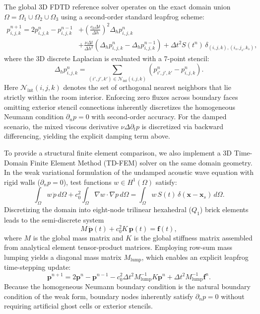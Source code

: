 \documentclass{Configuration_Files/PoliMi3i_thesis}
\newif\ifshowthesischanges
\DeclareRobustCommand{\thesischange}[2]{%
    \ifshowthesischanges
        \textcolor{#1}{#2}%
    \else
        #2%
    \fi
}
\def\thesischange#1#2{#2}%
\begin{document}
\thesischange{red}{The global 3D FDTD reference solver operates on the exact domain union $\Omega = \Omega_1 \cup \Omega_2 \cup \Omega_3$ using a second-order standard leapfrog scheme:
\begin{equation}
\begin{aligned}
p^{n+1}_{i,j,k} = 2 p^n_{i,j,k} - p^{n-1}_{i,j,k} &+ \left(\frac{c_0 \Delta t}{\Delta h}\right)^2 \Delta_h p^n_{i,j,k} \\
&+ \frac{\nu \Delta t}{\Delta h^2} \left( \Delta_h p^n_{i,j,k} - \Delta_h p^{n-1}_{i,j,k} \right) + \Delta t^2 S(t^n) \, \delta_{(i,j,k),(i_s,j_s,k_s)},
\end{aligned}
\end{equation}
where the 3D discrete Laplacian is evaluated with a 7-point stencil:
\begin{equation}
\Delta_h p^n_{i,j,k} = \sum_{(i',j',k') \in \mathcal{N}_{\text{int}}(i,j,k)} \left( p^n_{i',j',k'} - p^n_{i,j,k} \right).
\end{equation}
Here $\mathcal{N}_{\text{int}}(i,j,k)$ denotes the set of orthogonal nearest neighbors that lie strictly within the room interior. Enforcing zero fluxes across boundary faces omitting exterior stencil connections inherently discretizes the homogeneous Neumann condition $\partial_n p = 0$ with second-order accuracy. For the damped scenario, the mixed viscous derivative $\nu \Delta \partial_t p$ is discretized via backward differencing, yielding the explicit damping term above.}

\thesischange{red}{To provide a structural finite element comparison, we also implement a 3D Time-Domain Finite Element Method (TD-FEM) solver on the same domain geometry. In the weak variational formulation of the undamped acoustic wave equation with rigid walls ($\partial_n p = 0$), test functions $w \in H^1(\Omega)$ satisfy:
\begin{equation}
\int_\Omega w \, \ddot{p} \, d\Omega + c_0^2 \int_\Omega \nabla w \cdot \nabla p \, d\Omega = \int_\Omega w \, S(t) \, \delta(\mathbf{x} - \mathbf{x}_s) \, d\Omega.
\end{equation}
Discretizing the domain into eight-node trilinear hexahedral ($Q_1$) brick elements leads to the semi-discrete system
\begin{equation}
M \, \ddot{\mathbf{p}}(t) + c_0^2 K \, \mathbf{p}(t) = \mathbf{f}(t),
\end{equation}
where $M$ is the global mass matrix and $K$ is the global stiffness matrix assembled from analytical element tensor-product matrices. Employing row-sum mass lumping yields a diagonal mass matrix $M_{\mathrm{lump}}$, which enables an explicit leapfrog time-stepping update:
\begin{equation}
\mathbf{p}^{n+1} = 2 \mathbf{p}^n - \mathbf{p}^{n-1} - c_0^2 \Delta t^2 M_{\mathrm{lump}}^{-1} K \mathbf{p}^n + \Delta t^2 M_{\mathrm{lump}}^{-1} \mathbf{f}^n.
\end{equation}
Because the homogeneous Neumann boundary condition is the natural boundary condition of the weak form, boundary nodes inherently satisfy $\partial_n p = 0$ without requiring artificial ghost cells or exterior stencils.}
\end{document}
